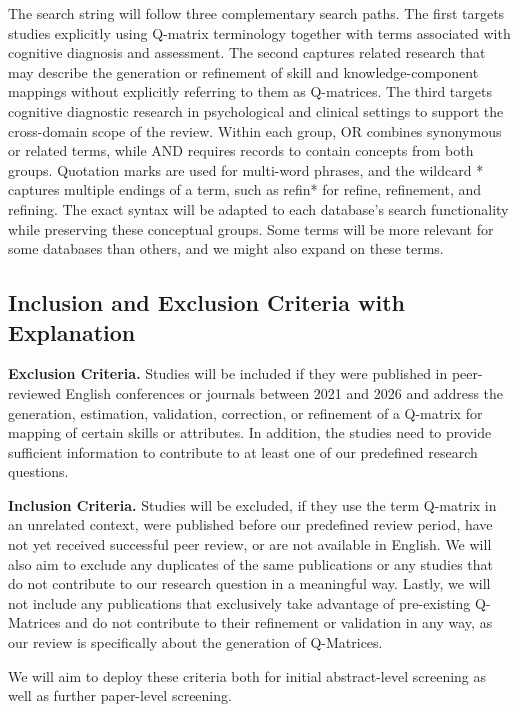 \documentclass[sigconf,nonacm]{acmart}
\begin{document}
The search string will follow three complementary search paths. The first targets studies explicitly using Q-matrix terminology together with terms associated with cognitive diagnosis and assessment. The second captures related research that may describe the generation or refinement of skill and knowledge-component mappings without explicitly referring to them as Q-matrices. The third targets cognitive diagnostic research in psychological and clinical settings to support the cross-domain scope of the review. Within each group, OR combines synonymous or related terms, while AND requires records to contain concepts from both groups. Quotation marks are used for multi-word phrases, and the wildcard * captures multiple endings of a term, such as refin* for refine, refinement, and refining. The exact syntax will be adapted to each database's search functionality while preserving these conceptual groups. Some terms will be more relevant for some databases than others, and we might also expand on these terms.

\subsection{Inclusion and Exclusion Criteria with Explanation}

\textbf{Exclusion Criteria.} Studies will be included if they were published in peer-reviewed English conferences or journals between 2021 and 2026 and address the generation, estimation, validation, correction, or refinement of a Q-matrix for mapping of certain skills or attributes. In addition, the studies need to provide sufficient information to contribute to at least one of our predefined research questions.

\textbf{Inclusion Criteria.} Studies will be excluded, if they use the term Q-matrix in an unrelated context, were published before our predefined review period, have not yet received successful peer review, or are not available in English. We will also aim to exclude any duplicates of the same publications or any studies that do not contribute to our research question in a meaningful way. Lastly, we will not include any publications that exclusively take advantage of pre-existing Q-Matrices and do not contribute to their refinement or validation in any way, as our review is specifically about the generation of Q-Matrices.

We will aim to deploy these criteria both for initial abstract-level screening as well as further paper-level screening.
\end{document}
